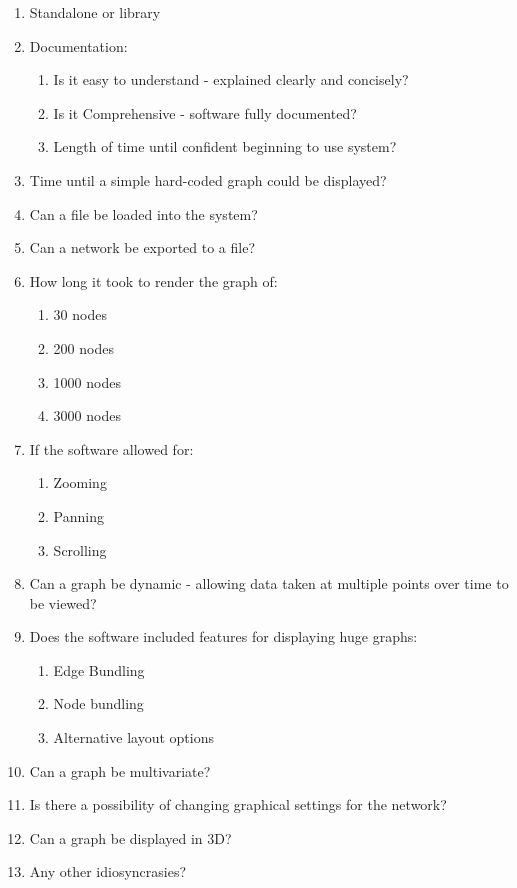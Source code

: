 \documentclass[../dissertation.tex]{subfiles}
\begin{document}
\begin{enumerate}
	\item Standalone or library
	\item Documentation:
	\begin{enumerate}
		\item Is it easy to understand - explained clearly and concisely?
		\item Is it Comprehensive - software fully documented?
		\item Length of time until confident beginning to use system?
	\end{enumerate}
	\item Time until a simple hard-coded graph could be displayed?
	\item Can a file be loaded into the system?
	\item Can a network be exported to a file?
	\item How long it took to render the graph of:
	\begin{enumerate}
	    \item 30 nodes
	    \item 200 nodes
	    \item 1000 nodes
	    \item 3000 nodes
	\end{enumerate}
	\item If the software allowed for:
	\begin{enumerate}
		\item Zooming
		\item Panning
		\item Scrolling
	\end{enumerate}
	\item Can a graph be dynamic - allowing data taken at multiple points over time to be viewed?
	\item Does the software included features for displaying huge graphs:
	\begin{enumerate}
		\item Edge Bundling
		\item Node bundling
		\item Alternative layout options
	\end{enumerate}
	\item Can a graph be multivariate?
	\item Is there a possibility of changing graphical settings for the network?
	\item Can a graph be displayed in 3D?
	\item Any other idiosyncrasies?
\end{enumerate}
\end{document}
